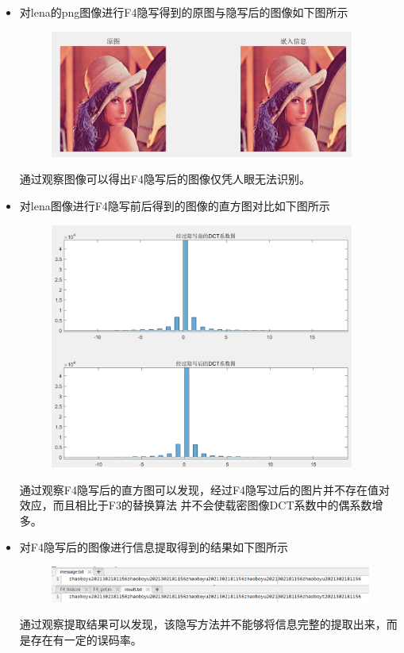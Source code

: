 \documentclass[a4paper,11pt,UTF8]{ctexart}
\newcommand{\bottomcaption}{%
\setlength{\abovecaptionskip}{6pt}%
\setlength{\belowcaptionskip}{6pt}%
\caption}
\newcommand{\xiaowuhao}{\fontsize{9pt}{\baselineskip}\selectfont}   %
\begin{document}
    \begin{itemize}

      \item 对lena的png图像进行F4隐写得到的原图与隐写后的图像如下图所示
        \begin{figure}[H]
          \centering
          \includegraphics[width=10cm]{F4_image_compare.png}
          \bottomcaption{\xiaowuhao{F4隐写过后原图与隐写后图像的对比}}
        \end{figure}
        通过观察图像可以得出F4隐写后的图像仅凭人眼无法识别。

      \item  对lena图像进行F4隐写前后得到的图像的直方图对比如下图所示
        \begin{figure}[H]
          \centering
          \includegraphics[width=10cm]{F4_hist_compare.png}
          \bottomcaption{\xiaowuhao{F4隐写过后原图与隐写后图像直方图的对比}}
        \end{figure}
        通过观察F4隐写后的直方图可以发现，经过F4隐写过后的图片并不存在值对效应，而且相比于F3的替换算法
        并不会使载密图像DCT系数中的偶系数增多。
        
      \item 对F4隐写后的图像进行信息提取得到的结果如下图所示
        \begin{figure}[H]
          \centering
          \includegraphics[width=11cm]{F4_get.png}
          \bottomcaption{\xiaowuhao{提取F4隐写后的图像的结果}}
        \end{figure}
        通过观察提取结果可以发现，该隐写方法并不能够将信息完整的提取出来，而是存在有一定的误码率。


\end{itemize}
\end{document}
